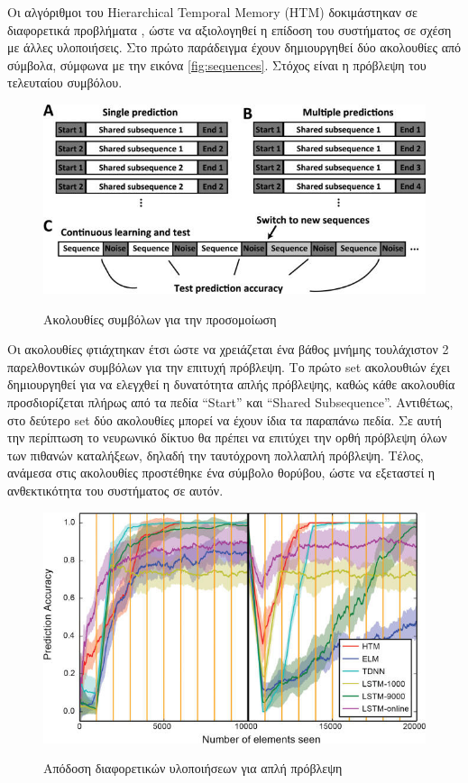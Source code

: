 Οι αλγόριθμοι του Hierarchical Temporal Memory (HTM) δοκιμάστηκαν σε διαφορετικά προβλήματα \cite{continuous,nab}, ώστε να αξιολογηθεί η επίδοση του συστήματος σε σχέση με άλλες υλοποιήσεις.
Στο πρώτο παράδειγμα έχουν δημιουργηθεί δύο ακολουθίες από σύμβολα, σύμφωνα με την εικόνα \eqref{fig:sequences}.
Στόχος είναι η πρόβλεψη του τελευταίου συμβόλου.
\begin{figure}[H]
	\centering%
	{\includegraphics[width=0.8\columnwidth,clip=true]{figures/vlsi/sequences.jpg}}
	\caption{Ακολουθίες συμβόλων για την προσομοίωση} \label{fig:sequences}
\end{figure}

Οι ακολουθίες φτιάχτηκαν έτσι ώστε να χρειάζεται ένα βάθος μνήμης τουλάχιστον 2 παρελθοντικών συμβόλων για την επιτυχή πρόβλεψη.
Το πρώτο set ακολουθιών έχει δημιουργηθεί για να ελεγχθεί η δυνατότητα απλής πρόβλεψης, καθώς κάθε ακολουθία προσδιορίζεται πλήρως από τα πεδία ``Start'' και ``Shared Subsequence''.
Αντιθέτως, στο δεύτερο set δύο ακολουθίες μπορεί να έχουν ίδια τα παραπάνω πεδία.
Σε αυτή την περίπτωση το νευρωνικό δίκτυο θα πρέπει να επιτύχει την ορθή πρόβλεψη όλων των πιθανών καταλήξεων, δηλαδή την ταυτόχρονη πολλαπλή πρόβλεψη.
Τέλος, ανάμεσα στις ακολουθίες προστέθηκε ένα σύμβολο θορύβου, ώστε να εξεταστεί η ανθεκτικότητα του συστήματος σε αυτόν.
\begin{figure}[H]
	\centering%
	{\includegraphics[width=0.7\columnwidth,clip=true]{figures/vlsi/single_prediction.jpg}}
	\caption{Απόδοση διαφορετικών υλοποιήσεων για απλή πρόβλεψη} \label{fig:single-prediction}
\end{figure}

